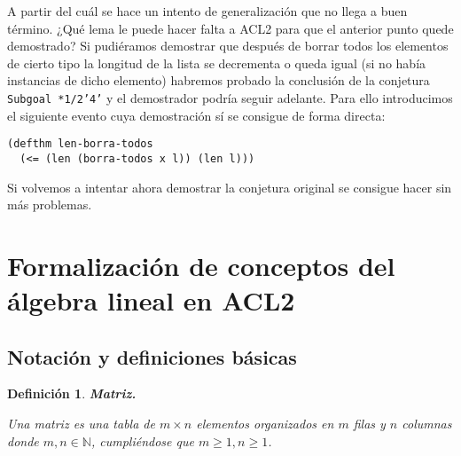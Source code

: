 \documentclass[a4paper,10pt]{article}
\newtheorem{defi}{{Definición}}
\begin{document}
\par\vspace{10pt}

A partir del cuál se hace un intento de generalización que no llega a buen término. ¿Qué lema le puede hacer falta a ACL2 para que el anterior punto quede demostrado? Si pudiéramos demostrar que después de borrar todos los elementos de cierto tipo la longitud de la lista se decrementa o queda igual (si no había instancias de dicho elemento) habremos probado la conclusión de la conjetura \texttt{Subgoal *1/2'4'} y el demostrador podría seguir adelante. Para ello introducimos el siguiente evento cuya demostración sí se consigue de forma directa:

\par\vspace{10pt}

\begin{lstlisting}[language=clips]
(defthm len-borra-todos
  (<= (len (borra-todos x l)) (len l)))
\end{lstlisting}

\par\vspace{10pt}

Si volvemos a intentar ahora demostrar la conjetura original se consigue hacer sin más problemas.

\newpage
\vspace{24pt}
\section{Formalización de conceptos del álgebra lineal en ACL2}

\vspace{12pt}
\subsection{Notación y definiciones básicas}
\vspace{10pt}

\begin{defi} \textbf{Matriz.}\vspace{8pt}\par
Una \emph{matriz} es una tabla de $m \times n$ elementos organizados en $m$ filas y $n$ columnas donde $m, n \in \mathbb{N}$, cumpliéndose que $m \geq 1, n \geq 1$.
\end{defi}

\par\vspace{10pt}
\end{document}
